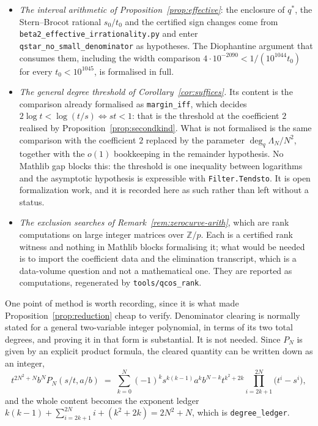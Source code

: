 \documentclass[11pt]{article}
\theoremstyle{plain}
\theoremstyle{definition}
\theoremstyle{remark}
\newcommand{\Z}{\mathbb{Z}}
\begin{document}
\begin{itemize}
It is an estimate on a $q$-series tail and enters \texttt{reduction} as a hypothesis, which is the
honest place for it: what is proved is that the estimate, together with $P_N(q,z_0)\ne0$, forces a
contradiction.
\item \emph{The interval arithmetic of Proposition~\ref{prop:effective}}: the enclosure of
$q^\ast$, the Stern--Brocot rational $s_0/t_0$ and the certified sign changes come from
\texttt{beta2\_effective\_irrationality.py} and enter \texttt{qstar\_no\_small\_denominator} as
hypotheses. The Diophantine argument that consumes them, including the width comparison
$4\cdot10^{-2090}<1/(10^{1044}t_0)$ for every $t_0<10^{1045}$, is formalised in full.
\item \emph{The general degree threshold of Corollary~\ref{cor:suffices}.} Its content is the
comparison already formalised as \texttt{margin\_iff}, which decides
$2\log t<\log(t/s)\iff st<1$: that is the threshold at the coefficient $2$ realised by
Proposition~\ref{prop:secondkind}. What is not formalised is the same comparison with the
coefficient $2$ replaced by the parameter $\deg_q\Lambda_N/N^2$, together with the $o(1)$
bookkeeping in the remainder hypothesis. No Mathlib gap blocks this: the threshold is one
inequality between logarithms and the asymptotic hypothesis is expressible with
\texttt{Filter.Tendsto}. It is open formalization work, and it is recorded here as such rather
than left without a status.
\item \emph{The exclusion searches of Remark~\ref{rem:zerocurve-arith}}, which are rank
computations on large integer matrices over $\Z/p$. Each is a certified rank witness and nothing
in Mathlib blocks formalising it; what would be needed is to import the coefficient data and the
elimination transcript, which is a data-volume question and not a mathematical one. They are
reported as computations, regenerated by \texttt{tools/qcos\_rank}.
\end{itemize}

\medskip
\noindent One point of method is worth recording, since it is what made
Proposition~\ref{prop:reduction} cheap to verify. Denominator clearing is normally stated for a
general two-variable integer polynomial, in terms of its two total degrees, and proving it in that
form is substantial. It is not needed. Since $P_N$ is given by an explicit product formula, the
cleared quantity can be written down as an integer,
\[
   t^{2N^2+N}b^N P_N(s/t,a/b)\;=\;\sum_{k=0}^{N}(-1)^ks^{k(k-1)}a^kb^{N-k}t^{k^2+2k}
   \!\!\prod_{i=2k+1}^{2N}\!\!\bigl(t^i-s^i\bigr),
\]
and the whole content becomes the exponent ledger
$k(k-1)+\sum_{i=2k+1}^{2N}i+(k^2+2k)=2N^2+N$, which is \texttt{degree\_ledger}.
\end{document}
